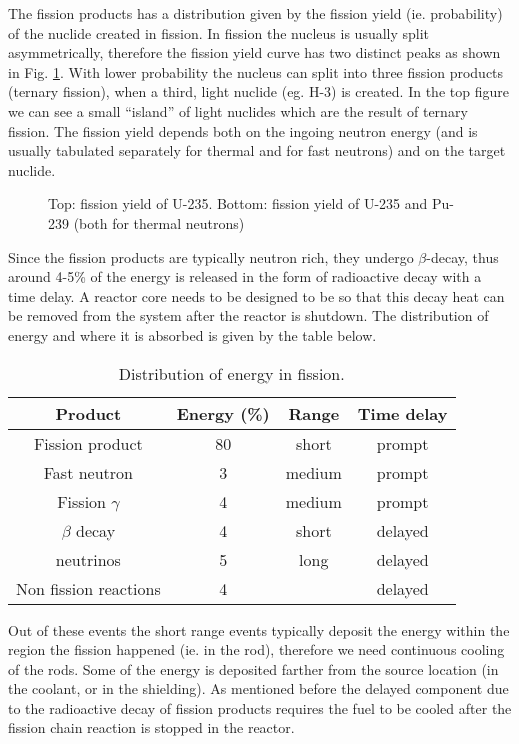 The fission products has a distribution given by the fission yield (ie. probability) of the nuclide created in fission. In fission the nucleus is usually split asymmetrically, therefore the fission yield curve has two distinct peaks as shown in Fig. \ref{fig:fissyield}. With lower probability the nucleus can split into three fission products (ternary fission), when a third, light nuclide (eg. H-3) is created. In the top figure we can see a small ``island'' of light nuclides which are the result of ternary fission. The fission yield depends both on the ingoing neutron energy (and is usually tabulated separately for thermal and for fast neutrons) and on the target nuclide.

\begin{figure}[ht!]
\protect {}\protect
\caption{\label{fig:fissyield} \footnotesize{Top: fission yield of U-235. Bottom: fission yield of U-235 and Pu-239 (both for thermal neutrons)}}
\end{figure}

Since the fission products are typically neutron rich, they undergo $\beta$-decay, thus around 4-5\% of the energy is released in the form of radioactive decay with a time delay. A reactor core needs to be designed to be so that this decay heat can be removed from the system after the reactor is shutdown. The distribution of energy and where it is absorbed is given by the table below.

\begin{table}\caption{Distribution of energy in fission.}
\begin{tabular}{c | c | c | c}
Product & Energy (\%) & Range & Time delay \\
\hline
Fission product & 80 & short & prompt \\
Fast neutron & 3 & medium & prompt \\
Fission $\gamma$ & 4 & medium & prompt \\
$\beta$ decay & 4 & short & delayed \\
neutrinos & 5 & long & delayed \\
Non fission reactions & 4 &  & delayed 
\end{tabular}
\end{table}

Out of these events the short range events typically deposit the energy within the region the fission happened (ie. in the rod), therefore we need continuous cooling of the rods. Some of the energy is deposited farther from the source location (in the coolant, or in the shielding). As mentioned before the delayed component due to the radioactive decay of fission products requires the fuel to be cooled after the fission chain reaction is stopped in the reactor.

